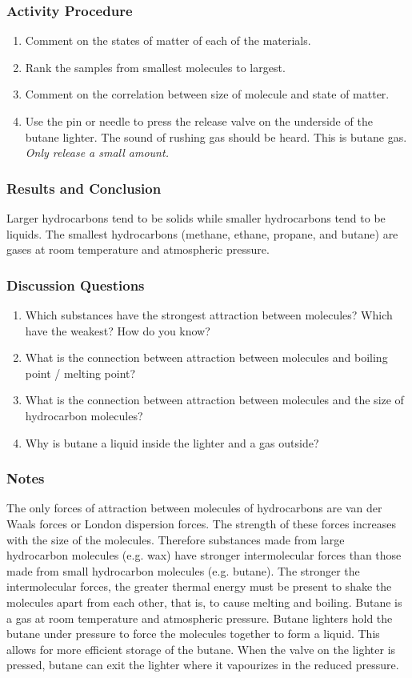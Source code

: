 \subsubsection*{Activity Procedure}
\begin{enumerate}
\item{Comment on the states of matter of each of the materials.}
\item{Rank the samples from smallest molecules to largest.}
\item{Comment on the correlation between size of molecule and state of matter.}
\item{Use the pin or needle to press the release valve on the underside of the butane lighter. The sound of rushing gas should be heard. This is butane gas. \textit{Only release a small amount.}}
\end{enumerate}

\subsubsection*{Results and Conclusion}
Larger hydrocarbons tend to be solids while smaller hydrocarbons tend to be liquids. The smallest hydrocarbons (methane, ethane, propane, and butane) are gases at room temperature and atmospheric pressure.

\subsubsection*{Discussion Questions}
\begin{enumerate}
\item{Which substances have the strongest attraction between molecules? Which have the weakest? How do you know?}
\item{What is the connection between attraction between molecules and boiling point / melting point?}
\item{What is the connection between attraction between molecules and the size of hydrocarbon molecules?}
\item{Why is butane a liquid inside the lighter and a gas outside?}
\end{enumerate}

\subsubsection*{Notes}
The only forces of attraction between molecules of hydrocarbons are van der Waals forces or London dispersion forces. The strength of these forces increases with the size of the molecules. Therefore substances made from large hydrocarbon molecules (e.g. wax) have stronger intermolecular forces than those made from small hydrocarbon molecules (e.g. butane). The stronger the intermolecular forces, the greater thermal energy must be present to shake the molecules apart from each other, that is, to cause melting and boiling.
Butane is a gas at room temperature and atmospheric pressure. Butane lighters hold the butane under pressure to force the molecules together to form a liquid. This allows for more efficient storage of the butane. When the valve on the lighter is pressed, butane can exit the lighter where it vapourizes in the reduced pressure.

